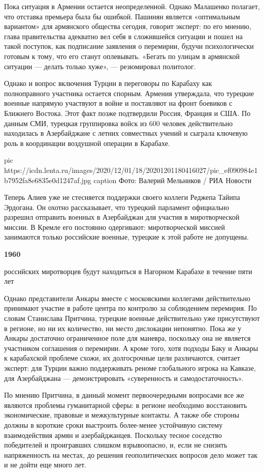 Пока ситуация в Армении остается неопределенной. Однако Малашенко полагает, что
отставка премьера была бы ошибкой. Пашинян является «оптимальным вариантом» для
армянского общества сегодня, говорит эксперт: по его мнению, глава
правительства адекватно вел себя в сложившейся ситуации и пошел на такой
поступок, как подписание заявления о перемирии, будучи психологически готовым к
тому, что его станут оплевывать. «Бегать по улицам в армянской ситуации —
делать только хуже», --- резюмировал политолог.

Однако и вопрос включения Турции в переговоры по Карабаху как полноправного
участника остается спорным. Армения утверждала, что турецкие военные напрямую
участвуют в войне и поставляют на фронт боевиков с Ближнего Востока. Этот факт
позже подтвердили Россия, Франция и США. По данным СМИ, турецкая группировка
войск из 600 человек действительно находилась в Азербайджане с летних
совместных учений и сыграла ключевую роль в координации воздушной операции в
Карабахе.

\ifcmt
pic https://icdn.lenta.ru/images/2020/12/01/18/20201201180416027/pic_ef090984e1b7952fa8e6835e0d1247af.jpg
caption Фото: Валерий Мельников / РИА Новости
\fi

Теперь Алиев уже не стесняется поддержки своего коллеги Реджепа Тайипа
Эрдогана. Он охотно рассказывает, что турецкий парламент официально разрешил
отправить военных в Азербайджан для участия в миротворческой миссии. В Кремле
его постоянно одергивают: миротворческой миссией занимаются только российские
военные, турецкие к этой работе не допущены.

\begin{leftbar}
	\bfseries
{\Huge\centering\color{orange} 1960}\par
российских миротворцев будут находиться в Нагорном Карабахе в течение пяти лет
\end{leftbar}

Однако представители Анкары вместе с московскими коллегами действительно
принимают участие в работе центра по контролю за соблюдением перемирия. По
словам Станислава Притчина, турецкие военные действительно уже присутствуют в
регионе, но ни их количество, ни место дислокации непонятно. Пока же у Анкары
достаточно ограниченное поле для маневра, поскольку она не является участником
соглашения о перемирии. А кроме того, хотя подходы Баку и Анкары к карабахской
проблеме схожи, их долгосрочные цели различаются, считает эксперт: для Турции
важно поддерживать реноме глобального игрока на Кавказе, для Азербайджана —
демонстрировать «суверенность и самодостаточность».

По мнению Притчина, в данный момент первоочередными вопросами все же являются
проблемы гуманитарной сферы: в регионе необходимо восстановить экономические,
правовые и межкультурные контакты. А также обе стороны должны в короткие сроки
выстроить более-менее устойчивую систему взаимодействия армян и азербайджанцев.
Поскольку тесное соседство победителей и проигравших слишком взрывоопасно, и,
если не снизить напряженность на местах, до решения геополитических вопросов
дело может так и не дойти еще много лет.
